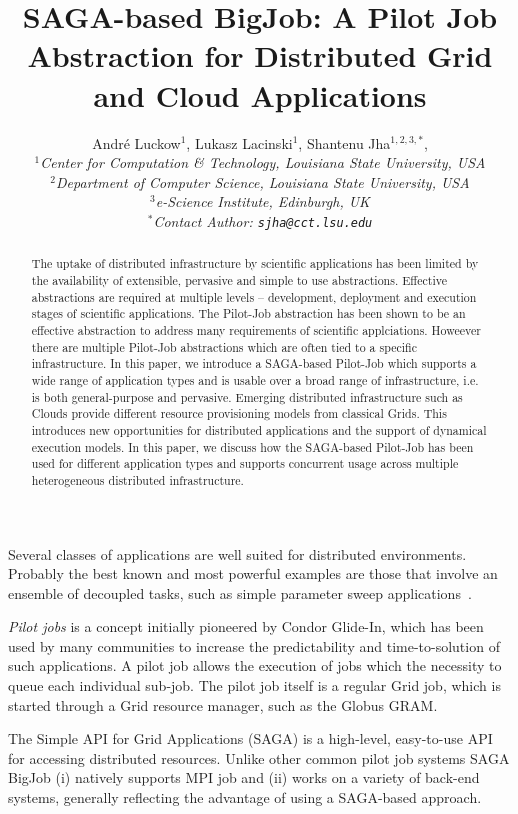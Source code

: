 \documentclass[conference,final]{IEEEtran}
\title{SAGA-based BigJob: A Pilot Job Abstraction for Distributed Grid and Cloud Applications}
\author{
Andr\'e Luckow$^{1}$, Lukasz Lacinski$^{1}$,   Shantenu Jha$^{1,2,3,*}$,\\
  \small{\emph{$^{1}$Center for Computation \& Technology, Louisiana State University, USA}}\\
  \small{\emph{$^{2}$Department of Computer Science, Louisiana State University, USA}}\\
  \small{\emph{$^{3}$e-Science Institute, Edinburgh, UK}}\\
  \small{\emph{$^{*}$Contact Author: \texttt{sjha@cct.lsu.edu}}}\\
}
\newcommand{\up}{\vspace*{-1em}}
\begin{document}
 

\maketitle    


\begin{abstract}
The uptake of distributed infrastructure by scientific applications has been limited by the availability of extensible, pervasive and simple to use abstractions. Effective abstractions are required at multiple levels -- development, deployment and execution stages of scientific applications. The Pilot-Job abstraction has been 
shown to be an effective abstraction to address many requirements of scientific applciations. Howeever there are multiple Pilot-Job abstractions which are often tied to a specific infrastructure.  In this paper, we introduce a SAGA-based Pilot-Job which supports a wide range of application types and is usable over a broad range of infrastructure, i.e. is both general-purpose and pervasive.  Emerging distributed infrastructure such as Clouds provide different resource provisioning models from classical Grids. This introduces new opportunities for distributed applications and the support of dynamical execution models. In this paper, we discuss how the
SAGA-based Pilot-Job has been used for different application types and supports concurrent usage across
multiple heterogeneous distributed infrastructure.
\end{abstract}

{}

Several classes of applications are well suited for distributed
environments. Probably the best known and most powerful examples are
those that involve an ensemble of decoupled tasks, such as simple
parameter sweep applications~\cite{1239909}.

\emph{Pilot jobs} is a concept initially pioneered by Condor Glide-In, which
has been used by many communities to increase the predictability
and time-to-solution of such applications. A pilot job allows the execution 
of jobs which the necessity to queue each individual sub-job. The pilot job itself
is a regular Grid job, which is started through a Grid resource manager, such as
the Globus GRAM.

The Simple API for Grid Applications (SAGA) is a high-level, easy-to-use API for 
accessing distributed resources. Unlike other common pilot job systems SAGA BigJob 
(i) natively supports MPI job and (ii) works on a variety of back-end systems, 
generally reflecting the advantage of using a SAGA-based approach.
\end{document}
